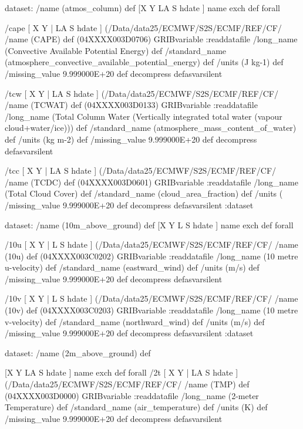 \begin{ingrid}
{dataset:
/name (atmos_column) def
[X Y LA S hdate ] {name exch def } forall

/cape { [ X Y | LA S hdate ] (/Data/data25/ECMWF/S2S/ECMF/REF/CF/%
/name (CAPE) def
(04XXXX003D0706) GRIBvariable
:readdatafile
/long_name (Convective Available Potential Energy) def
/standard_name (atmosphere_convective_available_potential_energy) def
/units (J kg-1) def
/missing_value 9.999000E+20 def
decompress
} defasvarsilent

/tcw { [ X Y | LA S hdate ] (/Data/data25/ECMWF/S2S/ECMF/REF/CF/%
/name (TCWAT) def
(04XXXX003D0133) GRIBvariable
:readdatafile
/long_name (Total Column Water (Vertically integrated total water (vapour cloud+water/ice))) def
/standard_name (atmosphere_mass_content_of_water) def
/units (kg m-2) def
/missing_value 9.999000E+20 def
decompress
} defasvarsilent

/tcc { [ X Y | LA S hdate ] (/Data/data25/ECMWF/S2S/ECMF/REF/CF/%
/name (TCDC) def
(04XXXX003D0601) GRIBvariable
:readdatafile
/long_name (Total Cloud Cover) def
/standard_name (cloud_area_fraction) def
/units (%
/missing_value 9.999000E+20 def
decompress
} defasvarsilent
:dataset

dataset:
/name (10m_above_ground) def
[X Y L S hdate ] {name exch def } forall

/10u { [ X Y | L S hdate ] (/Data/data25/ECMWF/S2S/ECMF/REF/CF/%
/name (10u) def
(04XXXX003C0202) GRIBvariable
:readdatafile
/long_name (10 metre u-velocity) def
/standard_name (eastward_wind) def
/units (m/s) def
/missing_value 9.999000E+20 def
decompress
} defasvarsilent

/10v { [ X Y | L S hdate ] (/Data/data25/ECMWF/S2S/ECMF/REF/CF/%
/name (10v) def
(04XXXX003C0203) GRIBvariable
:readdatafile
/long_name (10 metre v-velocity) def
/standard_name (northward_wind) def
/units (m/s) def
/missing_value 9.999000E+20 def
decompress
} defasvarsilent
:dataset

dataset:
/name (2m_above_ground) def

[X Y LA S hdate ] {name exch def } forall
/2t { [ X Y | LA S hdate ] (/Data/data25/ECMWF/S2S/ECMF/REF/CF/%
/name (TMP) def
(04XXXX003D0000) GRIBvariable
:readdatafile
/long_name (2-meter Temperature) def
/standard_name (air_temperature) def
/units (K) def
/missing_value 9.999000E+20 def
decompress
} defasvarsilent

}
\end{ingrid}
